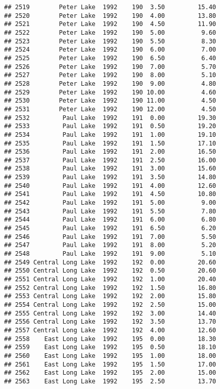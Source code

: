 \documentclass[
]{article}
\begin{document}
\begin{verbatim}
## 2519        Peter Lake  1992    190  3.50         15.40
## 2520        Peter Lake  1992    190  4.00         13.80
## 2521        Peter Lake  1992    190  4.50         11.90
## 2522        Peter Lake  1992    190  5.00          9.60
## 2523        Peter Lake  1992    190  5.50          8.30
## 2524        Peter Lake  1992    190  6.00          7.00
## 2525        Peter Lake  1992    190  6.50          6.40
## 2526        Peter Lake  1992    190  7.00          5.70
## 2527        Peter Lake  1992    190  8.00          5.10
## 2528        Peter Lake  1992    190  9.00          4.80
## 2529        Peter Lake  1992    190 10.00          4.60
## 2530        Peter Lake  1992    190 11.00          4.50
## 2531        Peter Lake  1992    190 12.00          4.50
## 2532         Paul Lake  1992    191  0.00         19.30
## 2533         Paul Lake  1992    191  0.50         19.20
## 2534         Paul Lake  1992    191  1.00         19.10
## 2535         Paul Lake  1992    191  1.50         17.10
## 2536         Paul Lake  1992    191  2.00         16.50
## 2537         Paul Lake  1992    191  2.50         16.00
## 2538         Paul Lake  1992    191  3.00         15.60
## 2539         Paul Lake  1992    191  3.50         14.80
## 2540         Paul Lake  1992    191  4.00         12.60
## 2541         Paul Lake  1992    191  4.50         10.80
## 2542         Paul Lake  1992    191  5.00          9.00
## 2543         Paul Lake  1992    191  5.50          7.80
## 2544         Paul Lake  1992    191  6.00          6.80
## 2545         Paul Lake  1992    191  6.50          6.20
## 2546         Paul Lake  1992    191  7.00          5.50
## 2547         Paul Lake  1992    191  8.00          5.20
## 2548         Paul Lake  1992    191  9.00          5.10
## 2549 Central Long Lake  1992    192  0.00         20.60
## 2550 Central Long Lake  1992    192  0.50         20.60
## 2551 Central Long Lake  1992    192  1.00         20.40
## 2552 Central Long Lake  1992    192  1.50         16.80
## 2553 Central Long Lake  1992    192  2.00         15.80
## 2554 Central Long Lake  1992    192  2.50         15.00
## 2555 Central Long Lake  1992    192  3.00         14.40
## 2556 Central Long Lake  1992    192  3.50         13.70
## 2557 Central Long Lake  1992    192  4.00         12.60
## 2558    East Long Lake  1992    195  0.00         18.30
## 2559    East Long Lake  1992    195  0.50         18.10
## 2560    East Long Lake  1992    195  1.00         18.00
## 2561    East Long Lake  1992    195  1.50         17.00
## 2562    East Long Lake  1992    195  2.00         15.00
## 2563    East Long Lake  1992    195  2.50         13.70

\end{verbatim}
\end{document}
